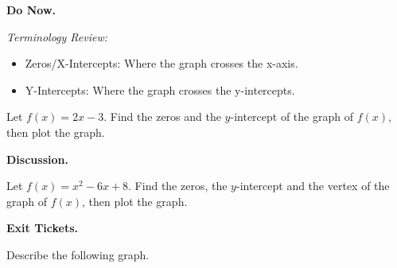 \documentclass[10pt]{article}
\title{}
\date{}
\begin{document}
{\noindent\bf Do Now.}

{\it
Terminology Review:
\begin{itemize}[leftmargin=4em]
\item
Zeros/X-Intercepts: Where the graph crosses the x-axis. 
\item
Y-Intercepts: Where the graph crosses the y-intercepts.
\end{itemize}
}
Let \(f(x) = 2x -3\). Find the zeros and the $y$-intercept of the graph of $f(x)$, then plot the graph.

{\noindent\bf Discussion.}

Let \(f(x) = x^2 - 6x +8\).  Find the zeros, the $y$-intercept and the vertex of the graph of $f(x)$, then plot the graph.

{\noindent\bf Exit Tickets.}

Describe the following graph.
\vspace{1em}

\end{document}
